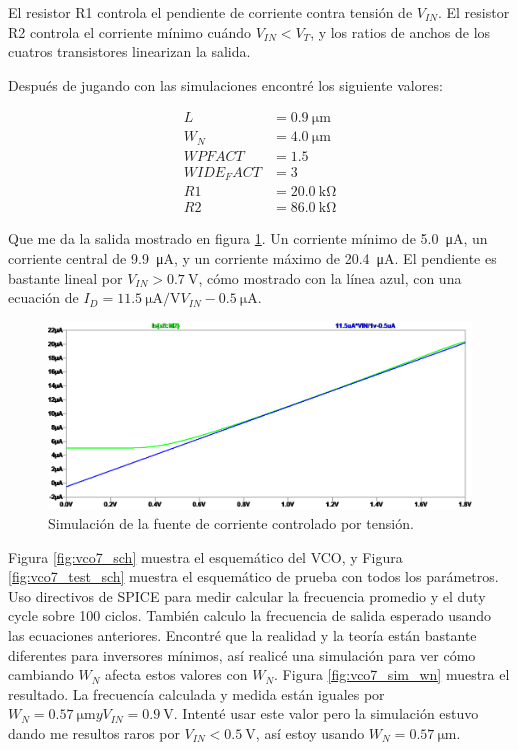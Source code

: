 \documentclass[a4paper]{article}
\begin{document}
El resistor R1 controla el pendiente de corriente contra tensión de $V_{IN}$. El resistor R2 controla el corriente mínimo cuándo $V_{IN} < V_T$, y los ratios de anchos de los cuatros transistores linearizan la salida.

Después de jugando con las simulaciones encontré los siguiente valores:

\begin{align*}
L &= \SI{0.9}{\micro\meter} \\
W_N &= \SI{4.0}{\micro\meter} \\
WPFACT &= 1.5 \\
WIDE_FACT &= 3 \\
R1 &= \SI{20.0}{\kilo\ohm} \\
R2 &= \SI{86.0}{\kilo\ohm}
\end{align*}

Que me da la salida mostrado en figura \ref{fig:current_source_sim}. Un corriente mínimo de \SI{5.0}{\micro\ampere}, un corriente central de \SI{9.9}{\micro\ampere}, y un corriente máximo de \SI{20.4}{\micro\ampere}. El pendiente es bastante lineal por $V_{IN} > \SI{0.7}{\volt}$, cómo mostrado con la línea azul, con una ecuación de $ I_D = \SI[per-mode=symbol]{11.5}{\micro\ampere\per\volt} V_{IN} - \SI{0.5}{\micro\ampere} $.

\begin{figure}[!htb]
\centering
\includegraphics[scale=0.4]{./img/current_source_sim}
\caption{Simulación de la fuente de corriente controlado por tensión.}
\label{fig:current_source_sim}
\end{figure}

Figura \ref{fig:vco7_sch} muestra el esquemático del VCO, y Figura \ref{fig:vco7_test_sch} muestra el esquemático de prueba con todos los parámetros. Uso directivos de SPICE para medir calcular la frecuencia promedio y el duty cycle sobre 100 ciclos. También calculo la frecuencia de salida esperado usando las ecuaciones anteriores. Encontré que la realidad y la teoría están bastante diferentes para inversores mínimos, así realicé una simulación para ver cómo cambiando $W_N$ afecta estos valores con $W_N$. Figura \ref{fig:vco7_sim_wn} muestra el resultado. La frecuencía calculada y medida están iguales por $W_N = \SI{0.57}{\micro\meter} y V_{IN} = \SI{0.9}{\volt}$. Intenté usar este valor pero la simulación estuvo dando me resultos raros por $V_{IN} < \SI{0.5}{\volt}$, así estoy usando $W_N = \SI{0.57}{\micro\meter}$.
\end{document}
